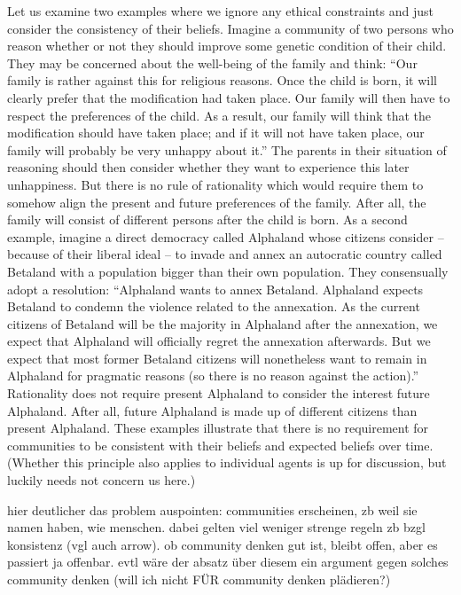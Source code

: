 Let us examine two examples where we ignore any ethical constraints and just consider the consistency of their beliefs. Imagine a community of two persons who reason whether or not they should improve some genetic condition of their child. They may be concerned about the well-being of the family and think: “Our family is rather against this for religious reasons. Once the child is born, it will clearly prefer that the modification had taken place. Our family will then have to respect the preferences of the child. As a result, our family will think that the modification should have taken place; and if it will not have taken place, our family will probably be very unhappy about it.” The parents in their situation of reasoning should then consider whether they want to experience this later unhappiness. But there is no rule of rationality which would require them to somehow align the present and future preferences of the family. After all, the family will consist of different persons after the child is born. As a second example, imagine a direct democracy called Alphaland whose citizens consider – because of their liberal ideal – to invade and annex an autocratic country called Betaland with a population bigger than their own population. They consensually adopt a resolution: “Alphaland wants to annex Betaland. Alphaland expects Betaland to condemn the violence related to the annexation. As the current citizens of Betaland will be the majority in Alphaland after the annexation, we expect that Alphaland will officially regret the annexation afterwards. But we expect that most former Betaland citizens will nonetheless want to remain in Alphaland for pragmatic reasons (so there is no reason against the action).” Rationality does not require present Alphaland to consider the interest future Alphaland. After all, future Alphaland is made up of different citizens than present Alphaland. These examples illustrate that there is no requirement for communities to be consistent with their beliefs and expected beliefs over time. (Whether this principle also applies to individual agents is up for discussion, but luckily needs not concern us here.) 

hier deutlicher das problem auspointen: communities erscheinen, zb weil sie namen haben, wie menschen. dabei gelten viel weniger strenge regeln zb bzgl konsistenz (vgl auch arrow). ob community denken gut ist, bleibt offen, aber es passiert ja offenbar. evtl wäre der absatz über diesem ein argument gegen solches community denken (will ich nicht FÜR community denken plädieren?) 

